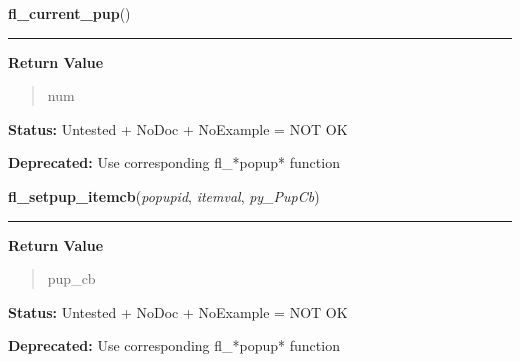     \label{xformslib:deprecated:fl_current_pup}

    \vspace{0.5ex}

\hspace{.8\funcindent}\begin{boxedminipage}{\funcwidth}

    \raggedright \textbf{fl\_current\_pup}()

    \vspace{-1.5ex}

    \rule{\textwidth}{0.5\fboxrule}
\setlength{\parskip}{2ex}
\setlength{\parskip}{1ex}
      \textbf{Return Value}
    \vspace{-1ex}

      \begin{quote}
      num

      \end{quote}

\textbf{Status:} Untested + NoDoc + NoExample = NOT OK



\textbf{Deprecated:} Use corresponding fl\_*popup* function



    \end{boxedminipage}

    \label{xformslib:deprecated:fl_setpup_itemcb}

    \vspace{0.5ex}

\hspace{.8\funcindent}\begin{boxedminipage}{\funcwidth}

    \raggedright \textbf{fl\_setpup\_itemcb}(\textit{popupid}, \textit{itemval}, \textit{py\_PupCb})

    \vspace{-1.5ex}

    \rule{\textwidth}{0.5\fboxrule}
\setlength{\parskip}{2ex}
\setlength{\parskip}{1ex}
      \textbf{Return Value}
    \vspace{-1ex}

      \begin{quote}
      pup\_cb

      \end{quote}

\textbf{Status:} Untested + NoDoc + NoExample = NOT OK



\textbf{Deprecated:} Use corresponding fl\_*popup* function



    \end{boxedminipage}

